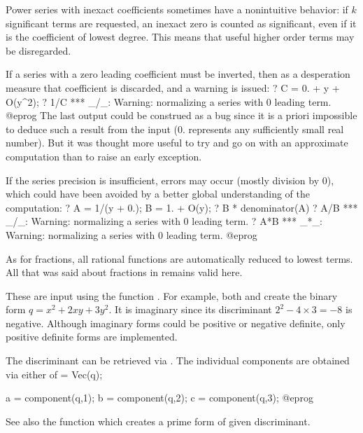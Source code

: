  Power series with inexact coefficients sometimes have a
nonintuitive behavior: if $k$ significant terms are requested, an inexact
zero is counted as significant, even if it is the coefficient of lowest
degree. This means that useful higher order terms may be disregarded.

If a series with a zero leading coefficient must be inverted, then as a
desperation measure that coefficient is discarded, and a warning is issued:
\bprog
? C = 0. + y + O(y^2);
? 1/C
  *** _/_: Warning: normalizing a series with 0 leading term.
@eprog\noindent
The last output could be construed as a bug since it is a priori impossible
to deduce such a result from the input ($0.$ represents any sufficiently
small real number). But it was thought more useful to try and go on with an
approximate computation than to raise an early exception.

If the series precision is insufficient, errors may occur (mostly division
by $0$), which could have been avoided by a better global understanding of
the computation:
\bprog
? A = 1/(y + 0.); B = 1. + O(y);
? B * denominator(A)
? A/B
  *** _/_: Warning: normalizing a series with 0 leading term.
? A*B
  *** _*_: Warning: normalizing a series with 0 leading term.
@eprog

%
As for fractions, all rational functions are automatically reduced to lowest
terms. All that was said about fractions in  remains valid
here.

%
These are input using the function . For example, both 
and  create the binary form $q = x^2+2xy+3y^2$. It is
imaginary since its discriminant $2^2 - 4\times 3 = -8$ is negative. Although
imaginary forms could be positive or negative definite, only positive
definite forms are implemented.

The discriminant can be retrieved via . The individual
components are obtained via either of
\bprog
  [a,b,c] = Vec(q);

  a = component(q,1);
  b = component(q,2);
  c = component(q,3);
@eprog

See also the function
 which creates a prime form of given discriminant.

